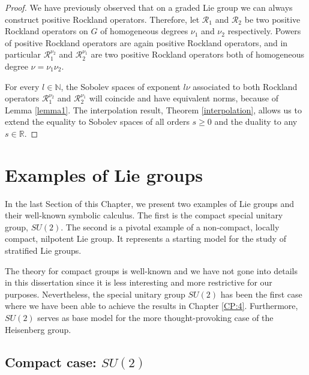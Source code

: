 \documentclass[12pt,oneside,a4paper]{book}
\numberwithin{equation}{section}     %
\theoremstyle{plain}
\theoremstyle{definition}
\newcommand{\N}{{\mathbb N}}
\newcommand{\R}{{\mathbb R}}
\begin{document}
\begin{proof}
	We have previously observed that on a graded Lie group we can always construct positive Rockland operators. Therefore, let $\mathcal{R}_1$ and $\mathcal{R}_2$ be two positive Rockland operators on $G$ of homogeneous degrees $\nu_1$ and $\nu_2$ respectively. Powers of positive Rockland operators are again positive Rockland operators, and in particular $\mathcal{R}_1^{\nu_2}$ and $\mathcal{R}_2^{\nu_1}$ are two positive Rockland operators both of homogeneous degree $\nu=\nu_1\nu_2$. 
	
	For every $l\in\N$, the Sobolev spaces of exponent $l\nu$ associated to both Rockland operators $\mathcal{R}_{1}^{\nu_2}$ and $\mathcal{R}_{2}^{\nu_1}$ will coincide and have equivalent norms, because of Lemma \ref{lemma1}. The interpolation result, Theorem \ref{interpolation}, allows us to extend the equality to Sobolev spaces of all orders $s\geq 0$ and the duality to any $s\in\R$.
\end{proof}
\section{Examples of Lie groups}
In the last Section of this Chapter, we present two examples of Lie groups and their well-known symbolic calculus. The first is the compact special unitary group, $SU(2)$. The second is a pivotal example of a non-compact, locally compact, nilpotent Lie group. It represents a starting model for the study of stratified Lie groups.

The theory for compact groups is well-known and we have not gone into details in this dissertation since it is less interesting and more restrictive for our purposes. Nevertheless, the special unitary group $SU(2)$ has been the first case where we have been able to achieve the results in Chapter \ref{CP:4}. Furthermore, $SU(2)$ serves as base model for the more thought-provoking case of the Heisenberg group. 

\subsection{Compact case: $SU(2)$}\label{SEC:SU2}
\end{document}
